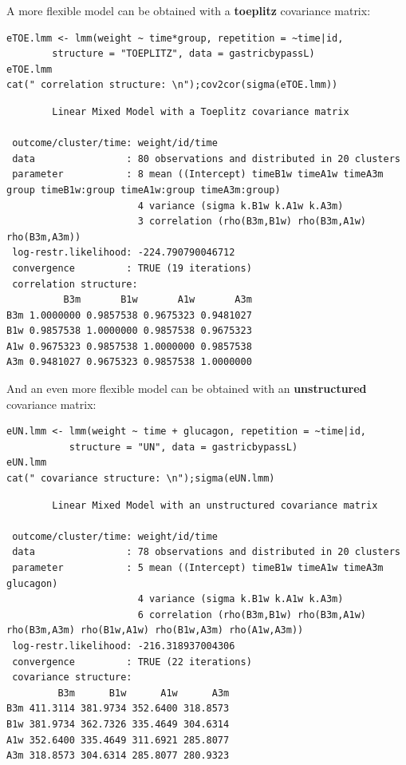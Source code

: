 \documentclass[12pt]{article}
\begin{document}
\noindent A more flexible model can be obtained with a \textbf{toeplitz} covariance matrix:
\lstset{language=r,label= ,caption= ,captionpos=b,numbers=none}
\begin{lstlisting}
eTOE.lmm <- lmm(weight ~ time*group, repetition = ~time|id,
		structure = "TOEPLITZ", data = gastricbypassL)
eTOE.lmm
cat(" correlation structure: \n");cov2cor(sigma(eTOE.lmm))
\end{lstlisting}

\begin{verbatim}
		Linear Mixed Model with a Toeplitz covariance matrix 

 outcome/cluster/time: weight/id/time 
 data                : 80 observations and distributed in 20 clusters 
 parameter           : 8 mean ((Intercept) timeB1w timeA1w timeA3m group timeB1w:group timeA1w:group timeA3m:group) 
                       4 variance (sigma k.B1w k.A1w k.A3m) 
                       3 correlation (rho(B3m,B1w) rho(B3m,A1w) rho(B3m,A3m)) 
 log-restr.likelihood: -224.790790046712 
 convergence         : TRUE (19 iterations)
 correlation structure: 
          B3m       B1w       A1w       A3m
B3m 1.0000000 0.9857538 0.9675323 0.9481027
B1w 0.9857538 1.0000000 0.9857538 0.9675323
A1w 0.9675323 0.9857538 1.0000000 0.9857538
A3m 0.9481027 0.9675323 0.9857538 1.0000000
\end{verbatim}

\clearpage

\noindent And an even more flexible model can be obtained with an
\textbf{unstructured} covariance matrix:

\lstset{language=r,label= ,caption= ,captionpos=b,numbers=none}
\begin{lstlisting}
eUN.lmm <- lmm(weight ~ time + glucagon, repetition = ~time|id,
	       structure = "UN", data = gastricbypassL)
eUN.lmm
cat(" covariance structure: \n");sigma(eUN.lmm)
\end{lstlisting}

\begin{verbatim}
		Linear Mixed Model with an unstructured covariance matrix 

 outcome/cluster/time: weight/id/time 
 data                : 78 observations and distributed in 20 clusters 
 parameter           : 5 mean ((Intercept) timeB1w timeA1w timeA3m glucagon) 
                       4 variance (sigma k.B1w k.A1w k.A3m) 
                       6 correlation (rho(B3m,B1w) rho(B3m,A1w) rho(B3m,A3m) rho(B1w,A1w) rho(B1w,A3m) rho(A1w,A3m)) 
 log-restr.likelihood: -216.318937004306 
 convergence         : TRUE (22 iterations)
 covariance structure: 
         B3m      B1w      A1w      A3m
B3m 411.3114 381.9734 352.6400 318.8573
B1w 381.9734 362.7326 335.4649 304.6314
A1w 352.6400 335.4649 311.6921 285.8077
A3m 318.8573 304.6314 285.8077 280.9323
\end{verbatim}
\end{document}
